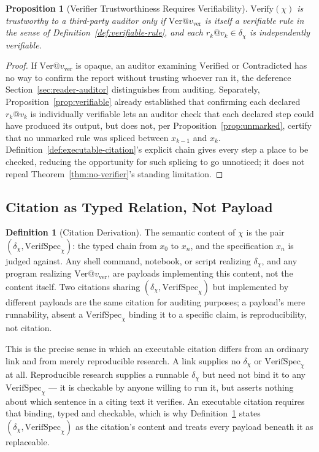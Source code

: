 \documentclass[11pt]{article}
\newtheorem{proposition}[theorem]{Proposition}
\theoremstyle{definition}
\newtheorem{definition}[theorem]{Definition}
\begin{document}
\begin{proposition}[Verifier Trustworthiness Requires Verifiability]
\label{prop:verify-inherits}
$\mathrm{Verify}(\chi)$ is trustworthy to a third-party auditor only if $\mathrm{Ver}@v_{\mathrm{ver}}$ is itself a verifiable rule in the sense of Definition~\ref{def:verifiable-rule}, and each $r_k@v_k \in \delta_\chi$ is independently verifiable.
\end{proposition}
\begin{proof}
If $\mathrm{Ver}@v_{\mathrm{ver}}$ is opaque, an auditor examining $\mathrm{Verified}$ or $\mathrm{Contradicted}$ has no way to confirm the report without trusting whoever ran it, the deference Section~\ref{sec:reader-auditor} distinguishes from auditing. Separately, Proposition~\ref{prop:verifiable} already established that confirming each declared $r_k@v_k$ is individually verifiable lets an auditor check that each declared step could have produced its output, but does not, per Proposition~\ref{prop:unmarked}, certify that no unmarked rule was spliced between $x_{k-1}$ and $x_k$. Definition~\ref{def:executable-citation}'s explicit chain gives every step a place to be checked, reducing the opportunity for such splicing to go unnoticed; it does not repeal Theorem~\ref{thm:no-verifier}'s standing limitation.
\end{proof}

\subsection{Citation as Typed Relation, Not Payload}

\begin{definition}[Citation Derivation]
\label{def:citation-derivation}
The semantic content of $\chi$ is the pair $(\delta_\chi, \mathrm{VerifSpec}_\chi)$: the typed chain from $x_0$ to $x_n$, and the specification $x_n$ is judged against. Any shell command, notebook, or script realizing $\delta_\chi$, and any program realizing $\mathrm{Ver}@v_{\mathrm{ver}}$, are payloads implementing this content, not the content itself. Two citations sharing $(\delta_\chi, \mathrm{VerifSpec}_\chi)$ but implemented by different payloads are the same citation for auditing purposes; a payload's mere runnability, absent a $\mathrm{VerifSpec}_\chi$ binding it to a specific claim, is reproducibility, not citation.
\end{definition}

This is the precise sense in which an executable citation differs from an ordinary link and from merely reproducible research. A link supplies no $\delta_\chi$ or $\mathrm{VerifSpec}_\chi$ at all. Reproducible research supplies a runnable $\delta_\chi$ but need not bind it to any $\mathrm{VerifSpec}_\chi$ --- it is checkable by anyone willing to run it, but asserts nothing about which sentence in a citing text it verifies. An executable citation requires that binding, typed and checkable, which is why Definition~\ref{def:citation-derivation} states $(\delta_\chi, \mathrm{VerifSpec}_\chi)$ as the citation's content and treats every payload beneath it as replaceable.
\end{document}
